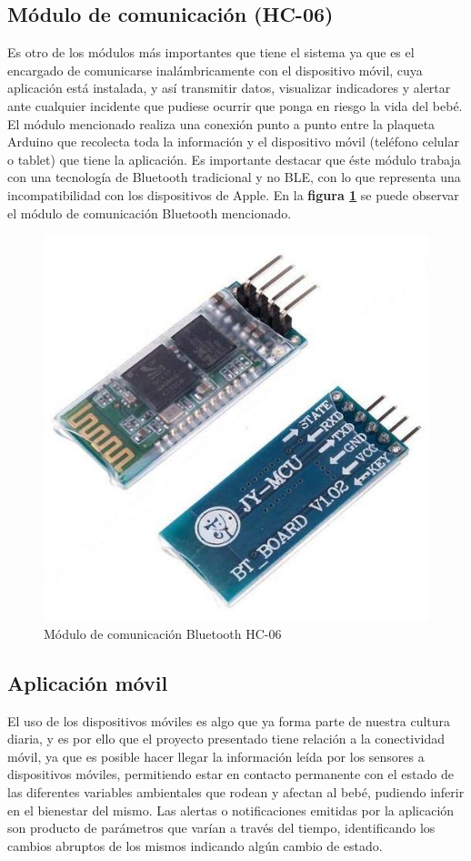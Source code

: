 \documentclass{IEEEtran}
\begin{document}
		\subsection{Módulo de comunicación (\textbf{HC-06})}

			Es otro de los módulos más importantes que tiene el sistema ya que es el encargado de comunicarse inalámbricamente con el dispositivo móvil, cuya aplicación está instalada, y así transmitir datos, visualizar indicadores y alertar ante cualquier incidente que pudiese ocurrir que ponga en riesgo la vida del bebé. El módulo mencionado realiza una conexión punto a punto entre la plaqueta Arduino que recolecta toda la información y el dispositivo móvil (teléfono celular o tablet) que tiene la aplicación. Es importante destacar que éste módulo trabaja con una tecnología de Bluetooth tradicional y no BLE, con lo que representa una incompatibilidad con los dispositivos de Apple. En la \textbf{figura \ref{arduino-modulo-bluetooth}} se puede observar el módulo de comunicación Bluetooth mencionado.

			\begin{figure}
				\centering
				\includegraphics[width=0.5\linewidth]{arduino-modulo-bluetooth}
				\caption{Módulo de comunicación Bluetooth HC-06}
				\label{arduino-modulo-bluetooth}
			\end{figure}

		\subsection{Aplicación móvil}
		
			El uso de los dispositivos móviles es algo que ya forma parte de nuestra cultura diaria, y es por ello que el proyecto presentado tiene relación a la conectividad móvil, ya que es posible hacer llegar la información leída por los sensores a dispositivos móviles, permitiendo estar en contacto permanente con el estado de las diferentes variables ambientales que rodean y afectan al bebé, pudiendo inferir en el bienestar del mismo. Las alertas o notificaciones emitidas por la aplicación son producto de parámetros que varían a través del tiempo, identificando los cambios abruptos de los mismos indicando algún cambio de estado. 
			
\end{document}
